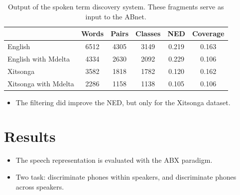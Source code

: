 \documentclass[final]{beamer}
\newcommand{\abnet}{{\sc ABnet}}
\begin{document}
\begin{frame}[t]
\begin{multicols}{3}
\begin{itemsize}
\begin{table}[h]
\caption{\label{tab:std-stats} Output of the spoken term discovery system. These fragments serve as input to the \abnet{}.}
\small
\begin{tabular}{lccccc}
\hline
         & Words & Pairs & Classes & NED   & Coverage \\
\hline
English & 6512 & 4305 & 3149 & 0.219 & 0.163 \\
English with Mdelta & 4334 & 2630 & 2092 & 0.229 & 0.106 \\
Xitsonga & 3582 & 1818 & 1782 & 0.120 & 0.162 \\
Xitsonga with Mdelta & 2286 & 1158 & 1138 &  0.105 & 0.106 \\
\hline
\end{tabular}
\end{table}

\begin{itemize}
\item The filtering did improve the NED, but only for the Xitsonga dataset.
\end{itemize}






\section{Results}

\begin{itemize}
\item The speech representation is evaluated with the ABX paradigm\cite{versteeghetal2015}.
\item Two task: discriminate phones within speakers, and discriminate phones across speakers.


\end{itemize}
\end{itemsize}
\end{multicols}
\end{frame}
\end{document}

